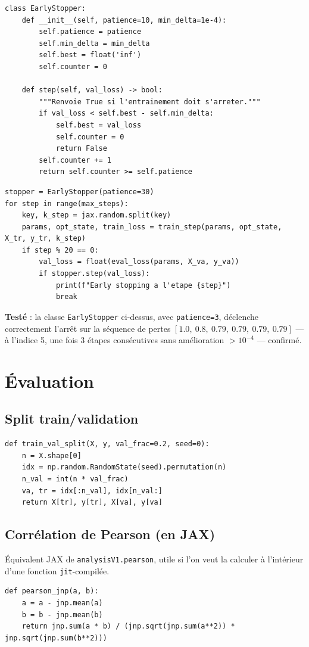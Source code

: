 \documentclass[11pt,a4paper]{article}
\begin{document}
\begin{lstlisting}
class EarlyStopper:
    def __init__(self, patience=10, min_delta=1e-4):
        self.patience = patience
        self.min_delta = min_delta
        self.best = float('inf')
        self.counter = 0

    def step(self, val_loss) -> bool:
        """Renvoie True si l'entrainement doit s'arreter."""
        if val_loss < self.best - self.min_delta:
            self.best = val_loss
            self.counter = 0
            return False
        self.counter += 1
        return self.counter >= self.patience
\end{lstlisting}

\begin{lstlisting}
stopper = EarlyStopper(patience=30)
for step in range(max_steps):
    key, k_step = jax.random.split(key)
    params, opt_state, train_loss = train_step(params, opt_state, X_tr, y_tr, k_step)
    if step % 20 == 0:
        val_loss = float(eval_loss(params, X_va, y_va))
        if stopper.step(val_loss):
            print(f"Early stopping a l'etape {step}")
            break
\end{lstlisting}

\begin{mdframed}
\textbf{Testé} : la classe \texttt{EarlyStopper} ci-dessus, avec
\texttt{patience=3}, déclenche correctement l'arrêt sur la séquence de pertes
$[1.0,\ 0.8,\ 0.79,\ 0.79,\ 0.79,\ 0.79]$ --- à l'indice 5, une fois 3 étapes
consécutives sans amélioration $> 10^{-4}$ --- confirmé.
\end{mdframed}

\section{Évaluation}

\subsection{Split train/validation}
\begin{lstlisting}
def train_val_split(X, y, val_frac=0.2, seed=0):
    n = X.shape[0]
    idx = np.random.RandomState(seed).permutation(n)
    n_val = int(n * val_frac)
    va, tr = idx[:n_val], idx[n_val:]
    return X[tr], y[tr], X[va], y[va]
\end{lstlisting}

\subsection{Corrélation de Pearson (en JAX)}
Équivalent JAX de \texttt{analysisV1.pearson}, utile si l'on veut la calculer
à l'intérieur d'une fonction \texttt{jit}-compilée.
\begin{lstlisting}
def pearson_jnp(a, b):
    a = a - jnp.mean(a)
    b = b - jnp.mean(b)
    return jnp.sum(a * b) / (jnp.sqrt(jnp.sum(a**2)) * jnp.sqrt(jnp.sum(b**2)))
\end{lstlisting}
\end{document}
